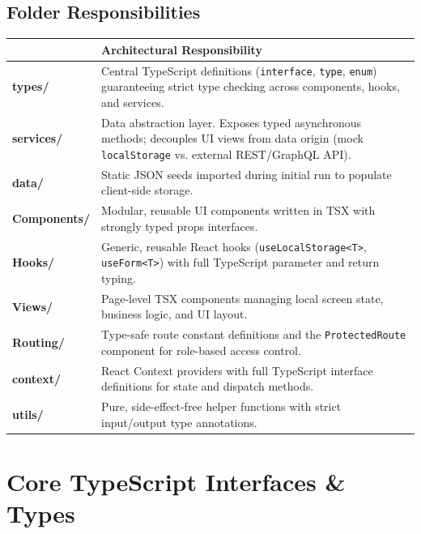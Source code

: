 \documentclass[11pt,a4paper]{article}
\begin{document}
\subsection{Folder Responsibilities}

{
\renewcommand{\arraystretch}{1.3}
\begin{tabularx}{\linewidth}{| >{\bfseries\ttfamily\color{primaryblue}}p{3.2cm} X |}
\hline
\rowcolor{primaryblue}
\multicolumn{1}{|l}{\bfseries\color{white} Directory} & \multicolumn{1}{l|}{\bfseries\color{white} Architectural Responsibility} \\
\hline
types/ & Central TypeScript definitions (\texttt{interface}, \texttt{type}, \texttt{enum}) guaranteeing strict type checking across components, hooks, and services. \\
\hline
\rowcolor{primaryblue!5}
services/ & Data abstraction layer. Exposes typed asynchronous methods; decouples UI views from data origin (mock \texttt{localStorage} vs. external REST/GraphQL API). \\
\hline
data/ & Static JSON seeds imported during initial run to populate client-side storage. \\
\hline
\rowcolor{primaryblue!5}
Components/ & Modular, reusable UI components written in TSX with strongly typed props interfaces. \\
\hline
Hooks/ & Generic, reusable React hooks (\texttt{useLocalStorage<T>}, \texttt{useForm<T>}) with full TypeScript parameter and return typing. \\
\hline
\rowcolor{primaryblue!5}
Views/ & Page-level TSX components managing local screen state, business logic, and UI layout. \\
\hline
Routing/ & Type-safe route constant definitions and the \texttt{ProtectedRoute} component for role-based access control. \\
\hline
\rowcolor{primaryblue!5}
context/ & React Context providers with full TypeScript interface definitions for state and dispatch methods. \\
\hline
utils/ & Pure, side-effect-free helper functions with strict input/output type annotations. \\
\hline
\end{tabularx}}

\newpage
\section{Core TypeScript Interfaces \& Types}
\end{document}

